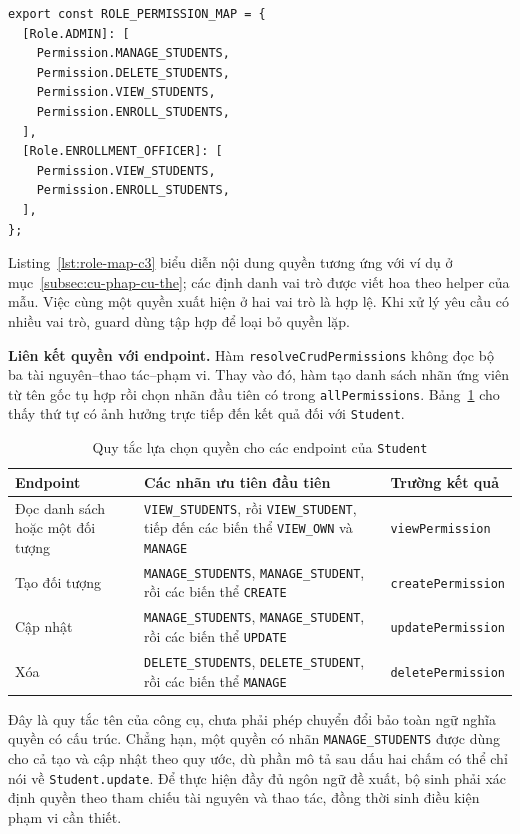 \begin{lstlisting}[caption={Ví dụ bảng quyền hiệu dụng từ chính sách rút gọn},label={lst:role-map-c3}]
export const ROLE_PERMISSION_MAP = {
  [Role.ADMIN]: [
    Permission.MANAGE_STUDENTS,
    Permission.DELETE_STUDENTS,
    Permission.VIEW_STUDENTS,
    Permission.ENROLL_STUDENTS,
  ],
  [Role.ENROLLMENT_OFFICER]: [
    Permission.VIEW_STUDENTS,
    Permission.ENROLL_STUDENTS,
  ],
};
\end{lstlisting}

Listing~\ref{lst:role-map-c3} biểu diễn nội dung quyền tương ứng với ví dụ ở mục~\ref{subsec:cu-phap-cu-the}; các định danh vai trò được viết hoa theo helper của mẫu. Việc cùng một quyền xuất hiện ở hai vai trò là hợp lệ. Khi xử lý yêu cầu có nhiều vai trò, guard dùng tập hợp để loại bỏ quyền lặp.

\textbf{Liên kết quyền với endpoint.} Hàm \texttt{resolveCrudPermissions} không đọc bộ ba tài nguyên--thao tác--phạm vi. Thay vào đó, hàm tạo danh sách nhãn ứng viên từ tên gốc tụ hợp rồi chọn nhãn đầu tiên có trong \texttt{allPermissions}. Bảng~\ref{tab:endpoint-quyen-c3} cho thấy thứ tự có ảnh hưởng trực tiếp đến kết quả đối với \texttt{Student}.

\begin{table}[htbp]
\centering
\caption{Quy tắc lựa chọn quyền cho các endpoint của \texttt{Student}}
\label{tab:endpoint-quyen-c3}
\small
\begin{tabularx}{\textwidth}{@{}p{2cm}Xl@{}}
\toprule
\textbf{Endpoint} & \textbf{Các nhãn ưu tiên đầu tiên} & \textbf{Trường kết quả} \\
\midrule
Đọc danh sách hoặc một đối tượng & \texttt{VIEW\_STUDENTS}, rồi \texttt{VIEW\_STUDENT}, tiếp đến các biến thể \texttt{VIEW\_OWN} và \texttt{MANAGE} & \texttt{viewPermission} \\
Tạo đối tượng & \texttt{MANAGE\_STUDENTS}, \texttt{MANAGE\_STUDENT}, rồi các biến thể \texttt{CREATE} & \texttt{createPermission} \\
Cập nhật & \texttt{MANAGE\_STUDENTS}, \texttt{MANAGE\_STUDENT}, rồi các biến thể \texttt{UPDATE} & \texttt{updatePermission} \\
Xóa & \texttt{DELETE\_STUDENTS}, \texttt{DELETE\_STUDENT}, rồi các biến thể \texttt{MANAGE} & \texttt{deletePermission} \\
\bottomrule
\end{tabularx}
\end{table}

Đây là quy tắc tên của công cụ, chưa phải phép chuyển đổi bảo toàn ngữ nghĩa quyền có cấu trúc. Chẳng hạn, một quyền có nhãn \texttt{MANAGE\_STUDENTS} được dùng cho cả tạo và cập nhật theo quy ước, dù phần mô tả sau dấu hai chấm có thể chỉ nói về \texttt{Student.update}. Để thực hiện đầy đủ ngôn ngữ đề xuất, bộ sinh phải xác định quyền theo tham chiếu tài nguyên và thao tác, đồng thời sinh điều kiện phạm vi cần thiết.

